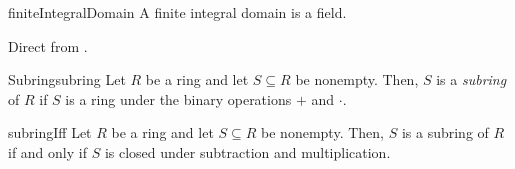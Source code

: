 \documentclass[../modern_algebra.tex]{subfiles}
\begin{document}
\begin{Corollary}{\textsf{}}{finiteIntegralDomain}
    A finite integral domain is a field\footnotemark.
\end{Corollary}
\begin{myproof}[Proof]
    Direct from .
\end{myproof}

\begin{Definition}[colbacktitle=red!75!black]{Subring}{subring}
    Let \(R\) be a ring and let \(S \subseteq R\) be nonempty.
    Then, \(S\) is a \textit{subring} of \(R\)
    if \(S\) is a ring under the binary operations \(+\) and \(\cdot\).
\end{Definition}

\begin{Theorem}{\textsf{}}{subringIff}
    Let \(R\) be a ring and let \(S \subseteq R\) be nonempty.
    Then, \(S\) is a subring of \(R\) if and only if
    \(S\) is closed under subtraction and multiplication.
\end{Theorem}
\end{document}

